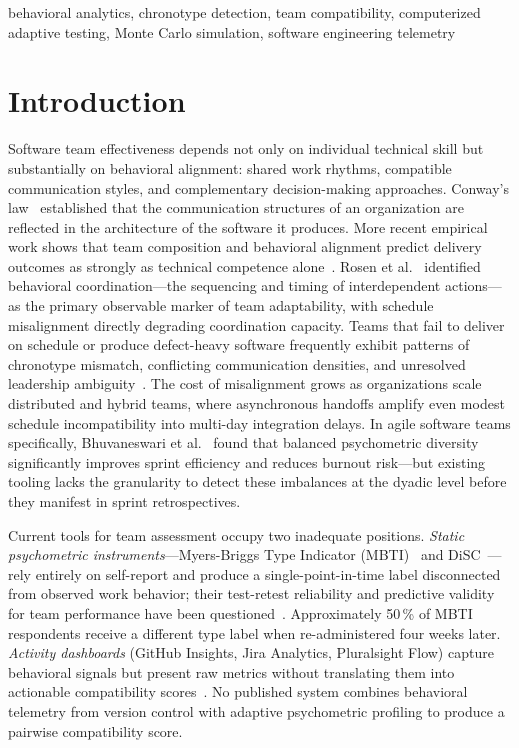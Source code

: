 \documentclass[conference]{IEEEtran}
\begin{document}
\begin{IEEEkeywords}
behavioral analytics, chronotype detection, team compatibility,
computerized adaptive testing, Monte Carlo simulation,
software engineering telemetry
\end{IEEEkeywords}

\section{Introduction}

Software team effectiveness depends not only on individual technical
skill but substantially on behavioral alignment: shared work rhythms,
compatible communication styles, and complementary decision-making
approaches.  Conway's law~\cite{herbsleb1999} established that the
communication structures of an organization are reflected in the
architecture of the software it produces.  More recent empirical
work shows that team composition and behavioral alignment predict
delivery outcomes as strongly as technical competence
alone~\cite{tamburri2019}.  Rosen et al.~\cite{rosen2011} identified
behavioral coordination---the sequencing and timing of interdependent
actions---as the primary observable marker of team adaptability,
with schedule misalignment directly degrading coordination capacity.
Teams that fail to deliver on schedule or produce defect-heavy
software frequently exhibit patterns of chronotype mismatch,
conflicting communication densities, and unresolved leadership
ambiguity~\cite{catolino2019}.  The cost of misalignment grows as
organizations scale distributed and hybrid teams, where asynchronous
handoffs amplify even modest schedule incompatibility into multi-day
integration delays.  In agile software teams specifically,
Bhuvaneswari et al.~\cite{bhuvaneswari2025} found that balanced
psychometric diversity significantly improves sprint efficiency and
reduces burnout risk---but existing tooling lacks the granularity
to detect these imbalances at the dyadic level before they manifest
in sprint retrospectives.

Current tools for team assessment occupy two inadequate positions.
\textit{Static psychometric instruments}---Myers-Briggs Type
Indicator (MBTI)~\cite{myers1943} and DiSC~\cite{marston1928}---rely
entirely on self-report and produce a single-point-in-time label
disconnected from observed work behavior; their test-retest
reliability and predictive validity for team performance have been
questioned~\cite{pittenger1993, halfhill2005}.  Approximately
50\,\% of MBTI respondents receive a different type label when
re-administered four weeks later.  \textit{Activity dashboards}
(GitHub Insights, Jira Analytics, Pluralsight Flow) capture
behavioral signals but present raw metrics without translating them
into actionable compatibility scores~\cite{dingsoyr2012}.  No
published system combines behavioral telemetry from version control
with adaptive psychometric profiling to produce a pairwise
compatibility score.
\end{document}
